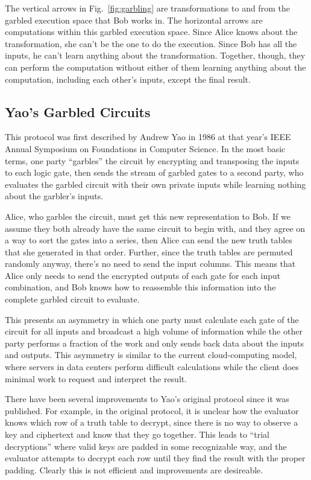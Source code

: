 The vertical arrows in Fig.~\ref{fig:garbling} are transformations to and from the garbled execution space that Bob works in. The horizontal arrows are computations within this garbled execution space. Since Alice knows about the transformation, she can't be the one to do the execution. Since Bob has all the inputs, he can't learn anything about the transformation. Together, though, they can perform the computation without either of them learning anything about the computation, including each other's inputs, except the final result.

\subsection{Yao's Garbled Circuits}
This protocol was first described by Andrew Yao in 1986 at that year's IEEE Annual Symposium on Foundations in Computer Science\cite{YaoGC}. In the most basic terms, one party ``garbles'' the circuit by encrypting and transposing the inputs to each logic gate, then sends the stream of garbled gates to a second party, who evaluates the garbled circuit with their own private inputs while learning nothing about the garbler's inputs.

Alice, who garbles the circuit, must get this new representation to Bob. If we assume they both already have the same circuit to begin with, and they agree on a way to sort the gates into a series, then Alice can send the new truth tables that she generated in that order. Further, since the truth tables are permuted randomly anyway, there's no need to send the input columns. This means that Alice only needs to send the encrypted outputs of each gate for each input combination, and Bob knows how to reassemble this information into the complete garbled circuit to evaluate.

This presents an asymmetry in which one party must calculate each gate of the circuit for all inputs and broadcast a high volume of information while the other party performs a fraction of the work and only sends back data about the inputs and outputs. This asymmetry is similar to the current cloud-computing model, where servers in data centers perform difficult calculations while the client does minimal work to request and interpret the result.

There have been several improvements to Yao's original protocol since it was published\cite{gentle}. For example, in the original protocol, it is unclear how the evaluator knows which row of a truth table to decrypt, since there is no way to observe a key and ciphertext and know that they go together. This leads to ``trial decryptions'' where valid keys are padded in some recognizable way, and the evaluator attempts to decrypt each row until they find the result with the proper padding. Clearly this is not efficient and improvements are desireable.

